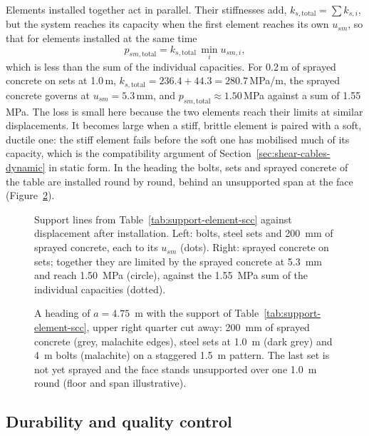 Elements installed together act in parallel. Their stiffnesses add,
$k_{s,\text{total}} = \sum k_{s,i}$, but the system reaches its capacity when
the first element reaches its own $u_{sm}$, so that for elements installed at
the same time
\[
p_{sm,\text{total}} = k_{s,\text{total}}\, \min_i u_{sm,i},
\]
which is less than the sum of the individual capacities. For 0.2\,m of
sprayed concrete on sets at 1.0\,m, $k_{s,\text{total}} = 236.4 + 44.3 =
280.7$\,MPa/m, the sprayed concrete governs at $u_{sm} = 5.3$\,mm, and
$p_{sm,\text{total}} \approx 1.50$\,MPa against a sum of 1.55\,MPa. The loss is
small here because the two elements reach their limits at similar
displacements. It becomes large when a stiff, brittle element is paired with
a soft, ductile one: the stiff element fails before the soft one has mobilised
much of its capacity, which is the compatibility argument of
Section~\ref{sec:shear-cables-dynamic} in static form. In the heading the
bolts, sets and sprayed concrete of the table are installed round by round, behind
an unsupported span at the face (Figure~\ref{fig:r3d-supported-heading}).

\begin{figure}[htbp]
\centering
{}
\caption{Support lines from Table~\ref{tab:support-element-scc} against displacement after installation. Left: bolts, steel sets and 200~mm of sprayed concrete, each to its $u_{sm}$ (dots). Right: sprayed concrete on sets; together they are limited by the sprayed concrete at 5.3~mm and reach 1.50~MPa (circle), against the 1.55~MPa sum of the individual capacities (dotted).}
\label{fig:support-element-scc}
\end{figure}

\begin{figure}[htbp]
\centering
{}
\caption{A heading of $a = 4.75$~m with the support of Table~\ref{tab:support-element-scc}, upper right quarter cut away: 200~mm of sprayed concrete (grey, malachite edges), steel sets at 1.0~m (dark grey) and 4~m bolts (malachite) on a staggered 1.5~m pattern. The last set is not yet sprayed and the face stands unsupported over one 1.0~m round (floor and span illustrative).}
\label{fig:r3d-supported-heading}
\end{figure}

\subsection{Durability and quality control}
\label{sec:scl-durability-qc}


